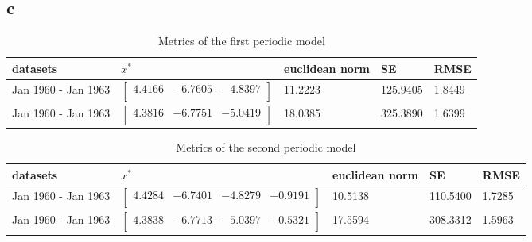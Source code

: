 \documentclass[unicode,11pt,a4paper,oneside,numbers=endperiod,openany]{scrartcl}
\begin{document}
\subsection*{c}

\begin{table}[H]
    \centering
    \caption{Metrics of the first periodic model}
    \label{table:ex3c-first}
    \begin{tabular}{||l l l l l||}
        \hline
        datasets            & $x^*$                                                         & euclidean norm & SE       & RMSE   \\
        \hline\hline
        Jan 1960 - Jan 1963 & $\begin{bmatrix} 4.4166 & -6.7605 & -4.8397\\ \end{bmatrix}$  & 11.2223        & 125.9405 & 1.8449 \\
        Jan 1960 - Jan 1963 & $\begin{bmatrix} 4.3816 & -6.7751 & -5.0419 \\ \end{bmatrix}$ & 18.0385        & 325.3890 & 1.6399 \\
        \hline
    \end{tabular}
\end{table}

\begin{table}[H]
    \centering
    \caption{Metrics of the second periodic model}
    \label{table:ex3c-second}
    \begin{tabular}{||l l l l l||}
        \hline
        datasets            & $x^*$                                                                   & euclidean norm & SE       & RMSE   \\
        \hline\hline
        Jan 1960 - Jan 1963 & $\begin{bmatrix}  4.4284 & -6.7401 & -4.8279 & -0.9191\\ \end{bmatrix}$ & 10.5138        & 110.5400 & 1.7285 \\
        Jan 1960 - Jan 1963 & $\begin{bmatrix} 4.3838 & -6.7713 & -5.0397 & -0.5321 \\ \end{bmatrix}$ & 17.5594        & 308.3312 & 1.5963 \\
        \hline
    \end{tabular}
\end{table}
\end{document}
